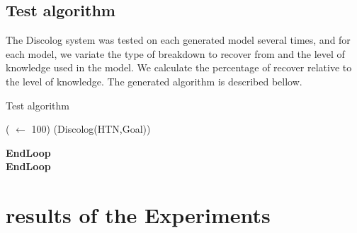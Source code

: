 \subsection{Test algorithm}
The Discolog system was tested on each generated model several times, and for each model, we variate the type of breakdown to recover from and the level of knowledge used in the model. We calculate the percentage of recover relative to the level of knowledge. The generated algorithm is described bellow.
\begin{algorithm}
	\caption{Test algorithm }\label{test}
	\begin{algorithmic}[]
		\Loop {}
\Loop ( $\gets$ 100)
\State(Discolog(HTN,Goal))

\EndLoop\textbf{EndLoop} \\
\EndLoop\textbf{EndLoop} \\
	\end{algorithmic}
\end{algorithm}
 
\section{ results of the Experiments}